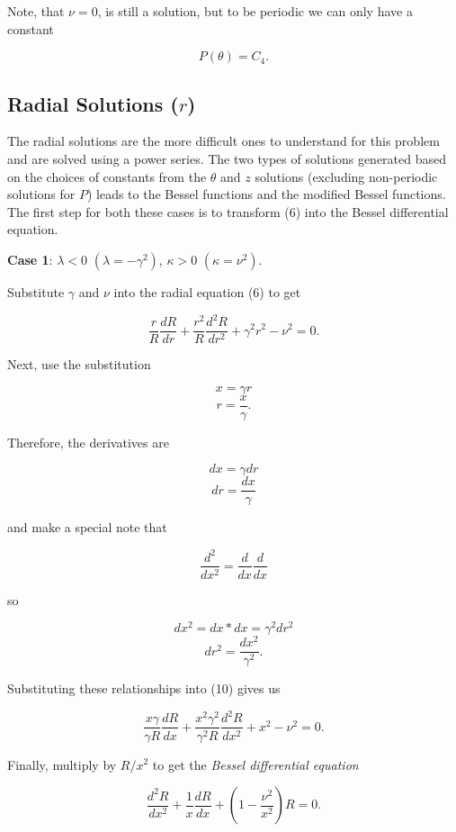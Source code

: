 \documentclass[12pt]{article}
\begin{document}
Note, that $\nu = 0$, is still a solution, but to be periodic we can only have a constant

$$P(\theta) = C_4.$$

\subsection{Radial Solutions ($r$)}

The radial solutions are the more difficult ones to understand for this problem and are solved using a power series.
The two types of solutions generated based on the choices of constants from the $\theta$ and $z$ solutions (excluding non-periodic solutions for $P$)
leads to the Bessel functions and the modified Bessel functions.  The first step for both these cases is to transform (6)
into the Bessel differential equation.

{\bf Case 1}: $\lambda < 0$ $(\lambda = -\gamma^2)$, $\kappa > 0$ $(\kappa = \nu^2)$.

Substitute $\gamma$ and $\nu$ into the radial equation (6) to get

\begin{equation}
\frac{r}{R} \frac{dR}{d r} + \frac{r^2}{R} \frac{d^2R}{d r^2} + \gamma^2 r^2  - \nu^2 = 0.
\end{equation}

Next, use the substitution

$$x = \gamma r$$
$$r = \frac{x}{\gamma}.$$

Therefore, the derivatives are

$$dx = \gamma dr$$
$$dr = \frac{dx}{\gamma}$$

and make a special note that

$$\frac{d^2}{dx^2} = \frac{d}{dx} \frac{d}{dx}$$

so

$$dx^2 = dx*dx = \gamma^2 dr^2$$
$$dr^2 = \frac{dx^2}{\gamma^2}.$$

Substituting these relationships into (10) gives us

$$\frac{x \gamma}{\gamma R} \frac{dR}{dx} + \frac{x^2 \gamma^2}{\gamma^2 R} \frac{d^2R}{dx^2} + x^2  - \nu^2 = 0.$$

Finally, multiply by $R/x^2$ to get the \emph{Bessel differential equation}

\begin{equation}
\frac{d^2R}{dx^2} + \frac{1}{x} \frac{dR}{dx} +  \left(1  - \frac{\nu^2}{x^2} \right )R = 0.
\end{equation}
\end{document}
